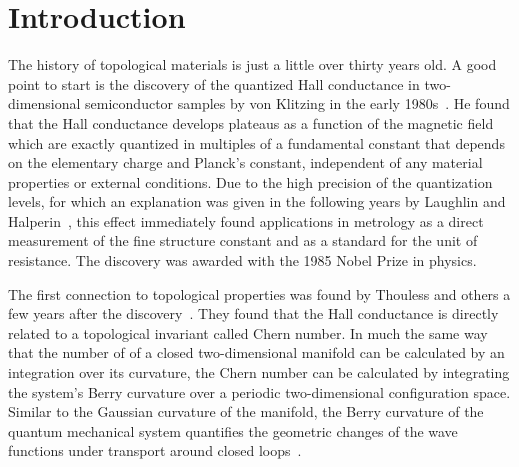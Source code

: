 \chapter*{Introduction}


The history of topological materials is just a little over thirty years old.
A good point to start is the discovery of the quantized Hall conductance in two-dimensional semiconductor samples by von Klitzing in the early 1980s~\cite{Klitzing1980,Klitzing1992}.
He found that the Hall conductance develops plateaus as a function of the magnetic field which are exactly quantized in multiples of a fundamental constant that depends on the elementary charge and Planck's constant, independent of any material properties or external conditions.
Due to the high precision of the quantization levels, for which an explanation was given in the following years by Laughlin and Halperin~\cite{Laughlin1981,Halperin1982}, this effect immediately found applications in metrology as a direct measurement of the fine structure constant and as a standard for the unit of resistance.
The discovery was awarded with the 1985 Nobel Prize in physics.

The first connection to topological properties was found by Thouless and others a few years after the discovery~\cite{Thouless1982,Niu1985,Kohmoto1985,Avron1985,Kohmoto1989,Bellissard1994,Avron2003}.
They found that the Hall conductance is directly related to a topological invariant called Chern number.
In much the same way that the number of  of a closed two-dimensional manifold can be calculated by an integration over its curvature, the Chern number can be calculated by integrating the system's Berry curvature over a periodic two-dimensional configuration space.
Similar to the Gaussian curvature of the manifold, the Berry curvature of the quantum mechanical system quantifies the geometric changes of the wave functions under transport around closed loops~\cite{Berry1984,Zak1989}.

